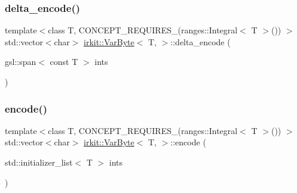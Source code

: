 \subsubsection{\texorpdfstring{delta\+\_\+encode()}{delta\_encode()}\hspace{0.1cm}{\footnotesize\ttfamily [2/2]}}
{\footnotesize\ttfamily template$<$class T, C\+O\+N\+C\+E\+P\+T\+\_\+\+R\+E\+Q\+U\+I\+R\+E\+S\+\_\+(ranges\+::\+Integral$<$ T $>$()) $>$ \\
std\+::vector$<$char$>$ \mbox{\hyperlink{structirkit_1_1VarByte}{irkit\+::\+Var\+Byte}}$<$ T, $>$\+::delta\+\_\+encode (\begin{DoxyParamCaption}\item[{gsl\+::span$<$ const T $>$}]{ints }\end{DoxyParamCaption})\hspace{0.3cm}{\ttfamily [inline]}}

\mbox{\label{structirkit_1_1VarByte_af69d2829dce3a298b40cd34c24841b06}} 
\subsubsection{\texorpdfstring{encode()}{encode()}\hspace{0.1cm}{\footnotesize\ttfamily [1/3]}}
{\footnotesize\ttfamily template$<$class T, C\+O\+N\+C\+E\+P\+T\+\_\+\+R\+E\+Q\+U\+I\+R\+E\+S\+\_\+(ranges\+::\+Integral$<$ T $>$()) $>$ \\
std\+::vector$<$char$>$ \mbox{\hyperlink{structirkit_1_1VarByte}{irkit\+::\+Var\+Byte}}$<$ T, $>$\+::encode (\begin{DoxyParamCaption}\item[{std\+::initializer\+\_\+list$<$ T $>$}]{ints }\end{DoxyParamCaption})\hspace{0.3cm}{\ttfamily [inline]}}

\mbox{\label{structirkit_1_1VarByte_ad886dac4e4765bf7c581f42629419610}} 
